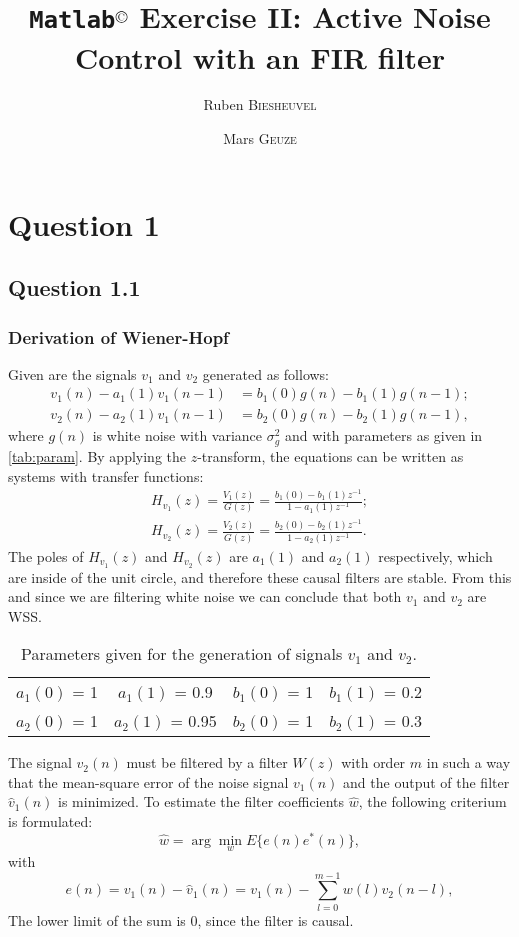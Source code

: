 \documentclass[12pt,a4paper]{article}
\title{\textbf{\texttt{Matlab}$^\text{{\fontsize{12}{1em}\textcopyright}}$ Exercise II: Active Noise Control with an FIR filter}}
\author[$\dagger$]{Ruben \textsc{Biesheuvel}}
\author[$\ddagger$]{Mars \textsc{Geuze}}
\affil[$\dagger$]{Student number 4076680}
\affil[$\ddagger$]{Student number 4109139}
\begin{document}
	\maketitle

\section*{Question 1}
\subsection*{Question 1.1}
\subsubsection*{Derivation of Wiener-Hopf}
Given are the signals $v_1$ and $v_2$ generated as follows:
\begin{align}
v_1(n) - a_1(1)v_1(n-1) &= b_1(0)g(n) - b_1(1)g(n-1);\\
v_2(n) - a_2(1)v_1(n-1) &= b_2(0)g(n) - b_2(1)g(n-1),
\end{align}
where $g(n)$ is white noise with variance $\sigma^2_g$ and with parameters as given in \autoref{tab:param}. By applying the $z$-transform, the equations can be written as systems with transfer functions:
\begin{align}\label{eq:H}
H_{v_1}(z) = \frac{V_1(z)}{G(z)} = \frac{b_1(0) - b_1(1)z^{-1}}{1 - a_1(1)z^{-1}};\\
H_{v_2}(z) = \frac{V_2(z)}{G(z)} = \frac{b_2(0) - b_2(1)z^{-1}}{1 - a_2(1)z^{-1}}.
\end{align}
The poles of $H_{v_1}(z)$ and $H_{v_2}(z)$ are $a_1(1)$ and $a_2(1)$ respectively, which are inside of the unit circle, and therefore these causal filters are stable. From this and since we are filtering white noise we can conclude that both $v_1$ and $v_2$ are WSS. 
\begin{table}
\centering
\caption{\label{tab:param}Parameters given for the generation of signals $v_1$ and $v_2$.}
\begin{tabular}{ c c c c }
\toprule
$a_1(0)$ = 1 & $a_1(1)$ = 0.9 & $b_1(0)$ = 1 & $b_1(1)$ = 0.2\\
$a_2(0)$ = 1 & $a_2(1)$ = 0.95 & $b_2(0)$ = 1 & $b_2(1)$ = 0.3\\
\bottomrule
\end{tabular}
\end{table}

The signal $v_2(n)$ must be filtered by a filter $W(z)$ with order $m$ in such a way that the mean-square error of the noise signal $v_1(n)$ and the output of the filter $\hat{v}_1(n)$ is minimized. To estimate the filter coefficients $\hat{w}$, the following criterium is formulated:
\begin{equation}\label{eq:minimize}
\hat{w} = \arg \min_{w} E\{e(n)e^*(n)\},
\end{equation}
with 
\begin{equation}\label{eq:e}
e(n) = v_1(n) - \hat{v}_1(n) = v_1(n) - \sum\limits_{l=0}^{m-1}w(l)v_2(n-l),
\end{equation}
The lower limit of the sum is 0, since the filter is causal.
\end{document}
